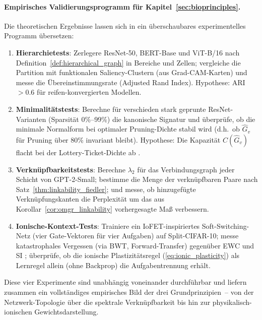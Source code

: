 \documentclass[12pt, a4paper, openany]{report}
\begin{document}
\paragraph{Empirisches Validierungsprogramm für Kapitel~\ref{sec:bioprinciples}.}
Die theoretischen Ergebnisse lassen sich in ein überschaubares
experimentelles Programm übersetzen:
\begin{enumerate}[label=(\alph*)]
  \item \textbf{Hierarchietests}: Zerlegere ResNet-50, BERT-Base und
    ViT-B/16 nach Definition~\ref{def:hierarchical_graph} in Bereiche und
    Zellen; vergleiche die Partition mit funktionalen Saliency-Clustern
    (aus Grad-CAM-Karten) und messe die Übereinstimmungs\-rate
    (Adjusted Rand Index).  Hypothese: ARI $> 0.6$ für reifen-konvergierten
    Modellen.
  \item \textbf{Minimalitätstests}: Berechne für verschieden stark geprunte
    ResNet-Varianten (Sparsität 0\%--99\%) die kanonische Signatur und
    überprüfe, ob die minimale Normal\-form bei optimaler Pruning-Dichte
    stabil wird (d.h.\ ob $\hat{G}_v$ für Pruning über 80\% invariant bleibt).
    Hypothese: Die Kapazität $C(\hat{G}_v)$ flacht bei der Lottery-Ticket-Dichte
    ab \cite{frankle19}.
  \item \textbf{Verknüpfbarkeitstests}: Berechne $\lambda_2$ für das
    Verbindungsgraph jeder Schicht von GPT-2-Small; bestimme die Menge der
    verknüpfbaren Paare nach Satz~\ref{thm:linkability_fiedler}; und messe,
    ob hinzugefügte Verknüpfungskanten die Perplexität um das aus
    Korollar~\ref{cor:omgr_linkability} vorhergesagte Maß verbessern.
  \item \textbf{Ionische-Kontext-Tests}: Trainiere ein
    IoFET-inspiriertes Soft-Switching-Netz (vier Gate-Vektoren für vier
    Aufgaben) auf Split-CIFAR-10; messe katastrophales Vergessen (via BWT,
    Forward-Transfer) gegenüber EWC \cite{kirkpatrick17} und SI \cite{zenke17};
    überprüfe, ob die ionische Plastizitäts\-regel (\cref{eq:ionic_plasticity})
    als Lernregel allein (ohne Backprop) die Aufgaben\-trennung erhält.
\end{enumerate}
Diese vier Experimente sind unabhängig voneinander durchführbar und liefern
zusammen ein vollständiges empirisches Bild der drei Grundprinzipien~--
von der Netzwerk-Topologie über die spektrale Verknüpfbarkeit bis hin zur
physikalisch-ionischen Gewichtsdarstellung.
\end{document}

